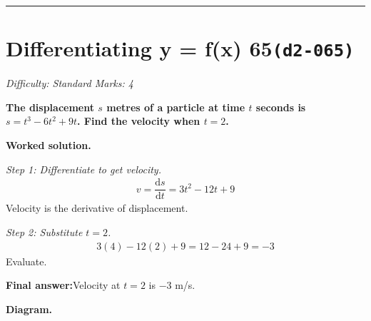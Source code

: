 \documentclass[11pt]{article}
\newcommand{\question}[1]{\par\medskip\noindent\textbf{#1}\par}
\begin{document}
\medskip\hrule

\section*{Differentiating y = f(x) 65\quad\small\texttt{(d2-065)}}
\textit{Difficulty: Standard \quad\textbar\quad Marks: 4}

\question{The displacement \( s \) metres of a particle at time \( t \) seconds is \( s = t^3 - 6t^2 + 9t \). Find the velocity when \( t = 2 \).}

\textbf{Worked solution.}

\textit{Step 1: Differentiate to get velocity.}
\[\begin{gathered}
v = \dfrac{\mathrm{d}s}{\mathrm{d}t} = 3t^2 - 12t + 9
\end{gathered}\]
Velocity is the derivative of displacement.

\textit{Step 2: Substitute \( t = 2 \).}
\[\begin{gathered}
3(4) - 12(2) + 9 = 12 - 24 + 9 = -3
\end{gathered}\]
Evaluate.

\begin{answerbox}
\textbf{Final answer:}\quad Velocity at \(\displaystyle  t = 2 \) is \(\displaystyle  -3 \) m/s.
\end{answerbox}
\textbf{Diagram.}
\end{document}
